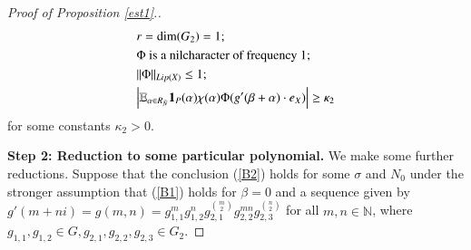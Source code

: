 \documentclass[12pt,amstex]{amsart}
\theoremstyle{definition}
\def \A {\alpha}
\def \B {\beta}
\def \D {\kappa}
\def \R {R_{\tilde{N}}}
\begin{document}
\begin{proof}[Proof of Proposition \ref{est1}.]
\begin{equation}\label{B3}
  \begin{split}
    & r=\dim(G_{2})=1;
    \\& \Phi \text{ is a nilcharacter of frequency } 1;
    \\& \Vert\Phi\Vert_{Lip(X)}\leq 1;
    \\& \Bigl\vert\mathbb{E}_{\A\in \R}\bold{1}_{P}(\A)\chi(\A)\Phi(g'(\B+\A)\cdot e_{X})\Bigr\vert\geq\D_{2}
  \end{split}
  \end{equation}
   for some constants $\D_{2}>0$.

\textbf{Step 2: Reduction to some particular polynomial.} We make some further reductions. Suppose that the conclusion (\ref{B2}) holds for some $\sigma$ and $N_{0}$ under the stronger assumption that (\ref{B1}) holds for $\B=0$ and a sequence given by $g'(m+ni)=g(m,n)=g_{1,1}^{m}g_{1,2}^{n}g_{2,1}^{\binom{m}{2}}g_{2,2}^{mn}g_{2,3}^{\binom{n}{2}}$ for all $m,n\in\mathbb{N}$, where $g_{1,1},g_{1,2}\in G, g_{2,1},g_{2,2},g_{2,3}\in G_{2}$.


\end{proof}
\end{document}
